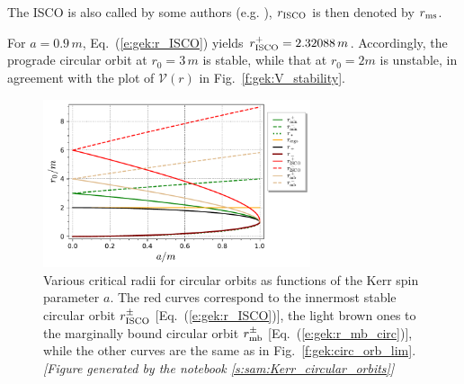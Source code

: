 \begin{remark}
The ISCO is also called  by some authors (e.g. \cite{BardePT72}), $r_{\rm ISCO}$ is then denoted by $r_{\rm ms}$.
\end{remark}

\begin{example}
For $a = 0.9\, m$, Eq.~(\ref{e:gek:r_ISCO}) yields $r_{\rm ISCO}^+ = 2.32088\, m$. Accordingly,
the prograde circular orbit at $r_0 = 3\, m$ is stable, while that at $r_0 = 2 m$ is unstable,
in agreement with the plot of $\mathcal{V}(r)$ in Fig.~\ref{f:gek:V_stability}.
\end{example}

\begin{figure}
\centerline{\includegraphics[width=0.7\textwidth]{gek_circ_orb_isco.pdf}}
\caption[]{\label{f:gek:circ_orb_isco} \footnotesize
Various critical radii for circular orbits as functions of the Kerr spin parameter $a$.
The red curves correspond to the innermost stable circular orbit $r_{\rm ISCO}^\pm$ [Eq.~(\ref{e:gek:r_ISCO})], the light brown ones to the marginally bound circular orbit
$r_{\rm mb}^\pm$ [Eq.~(\ref{e:gek:r_mb_circ})],
while the other curves are the same as in Fig.~\ref{f:gek:circ_orb_lim}.
\textsl{[Figure generated by the notebook \ref{s:sam:Kerr_circular_orbits}]}
}
\end{figure}

